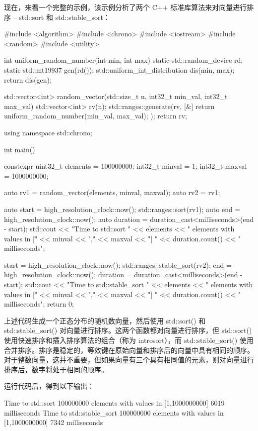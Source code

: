 现在，来看一个完整的示例，该示例分析了两个 C++ 标准库算法来对向量进行排序 – std::sort 和 std::stable\_sort：

\begin{cpp}
#include <algorithm>
#include <chrono>
#include <iostream>
#include <random>
#include <utility>

int uniform_random_number(int min, int max) {
    static std::random_device rd;
    static std::mt19937 gen(rd());
    std::uniform_int_distribution dis(min, max);
    return dis(gen);
}

std::vector<int> random_vector(std::size_t n, int32_t min_val, int32_t
max_val) {
    std::vector<int> rv(n);
    std::ranges::generate(rv, [&] {
        return uniform_random_number(min_val, max_val);
    });
    return rv;
}

using namespace std::chrono;

int main() {
    constexpr uint32_t elements = 100000000;
    int32_t minval = 1;
    int32_t maxval = 1000000000;

    auto rv1 = random_vector(elements, minval, maxval);
    auto rv2 = rv1;

    auto start = high_resolution_clock::now();
    std::ranges::sort(rv1);
    auto end = high_resolution_clock::now();
    auto duration = duration_cast<milliseconds>(end - start);
    std::cout << "Time to std::sort "
              << elements << " elements with values in ["
              << minval << "," << maxval << "] "
              << duration.count() << " milliseconds\n";

    start = high_resolution_clock::now();
    std::ranges::stable_sort(rv2);
    end = high_resolution_clock::now();
    duration = duration_cast<milliseconds>(end - start);
    std::cout << "Time to std::stable_sort "
              << elements << " elements with values in ["
              << minval << "," << maxval << "] "
              << duration.count() << " milliseconds\n";
    return 0;
}
\end{cpp}

上述代码生成一个正态分布的随机数向量，然后使用 std::sort() 和 std::stable\_sort() 对向量进行排序。这两个函数都对向量进行排序，但 std::sort() 使用快速排序和插入排序算法的组合（称为 introsort），而 std::stable\_sort() 使用合并排序。排序是稳定的，等效键在原始向量和排序后的向量中具有相同的顺序。对于整数向量，这并不重要，但如果向量有三个具有相同值的元素，则对向量进行排序后，数字将处于相同的顺序。

运行代码后，得到以下输出：

\begin{shell}
Time to std::sort 100000000 elements with values in [1,1000000000]
6019 milliseconds
Time to std::stable_sort 100000000 elements with values in
[1,1000000000] 7342 milliseconds
\end{shell}

